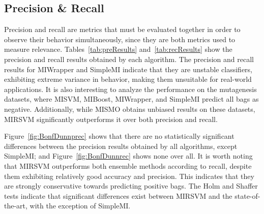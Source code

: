\documentclass[preprint,12pt]{elsarticle}
\begin{document}
\subsection{Precision \& Recall}
Precision and recall are metrics that must be evaluated together in order to observe their behavior simultaneously, since they are both metrics used to measure relevance. Tables~\ref{tab:preResults} and~\ref{tab:recResults} show the precision and recall results obtained by each algorithm. The precision and recall results for MIWrapper and SimpleMI indicate that they are unstable classifiers, exhibiting extreme variance in behavior, making them unsuitable for real-world applications. It is also interesting to analyze the performance on the mutagenesis datasets, where MISVM, MIBoost, MIWrapper, and SimpleMI predict all bags as negative. Additionally, while MISMO obtains unbiased results on these datasets, MIRSVM significantly outperforms it over both precision and recall.  

Figure~\ref{fig:BonfDunnprec} shows that there are no statistically significant differences between the precision results obtained by all algorithms, except SimpleMI; and Figure~\ref{fig:BonfDunnrec} shows none over all. It is worth noting that MIRSVM outperforms both ensemble methods according to recall, despite them exhibiting relatively good accuracy and precision. This indicates that they are strongly conservative towards predicting positive bags. The Holm and Shaffer tests indicate that significant differences exist between MIRSVM and the state-of-the-art, with the exception of SimpleMI. 
\end{document}
